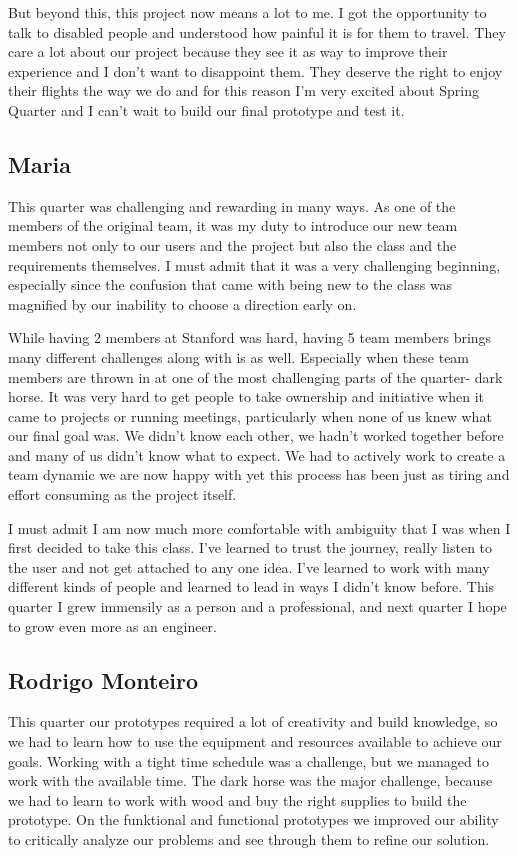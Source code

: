 But beyond this, this project now means a lot to me. I got the opportunity to talk to disabled people and understood how painful it is for them to travel. They care a lot about our project because they see it as way to improve their experience and I don’t want to disappoint them. They deserve the right to enjoy their flights the way we do and for this reason I’m very excited about Spring Quarter and I can’t wait to build our final prototype and test it.

\subsection{Maria}

This quarter was challenging and rewarding in many ways. As one of the members of the original team, it was my duty to introduce our new team members not only to our users and the project but also the class and the requirements themselves. I must admit that it was a very challenging beginning, especially since the confusion that came with being new to the class was magnified by our inability to choose a direction early on. 

While having 2 members at Stanford was hard, having 5 team members brings many different challenges along with is as well. Especially when these team members are thrown in at one of the most challenging parts of the quarter- dark horse. It was very hard to get people to take ownership and initiative when it came to projects or running meetings, particularly when none of us knew what our final goal was. We didn't know each other, we hadn't worked together before and many of us didn't know what to expect. We had to actively work to create a team dynamic we are now happy with yet this process has been just as tiring and effort consuming as the project itself. 

 I must admit I am now much more comfortable with ambiguity that I was when I first decided to take this class. I've learned to trust the journey, really listen to the user and not get attached to any one idea. I've learned to work with many different kinds of people and learned to lead in ways I didn't know before. This quarter I grew immensily as a person and a professional, and next quarter I hope to grow even more as an engineer. 

\subsection{Rodrigo Monteiro}
This quarter our prototypes required a lot of creativity and build knowledge, so we had to learn how to use the equipment and resources available to achieve our goals. Working with a tight time schedule was a challenge, but we managed to work with the available time. The dark horse was the major challenge, because we had to learn to work with wood and buy the right supplies to build the prototype. On the funktional and functional prototypes we improved our ability to critically analyze our problems and see through them to refine our solution.

